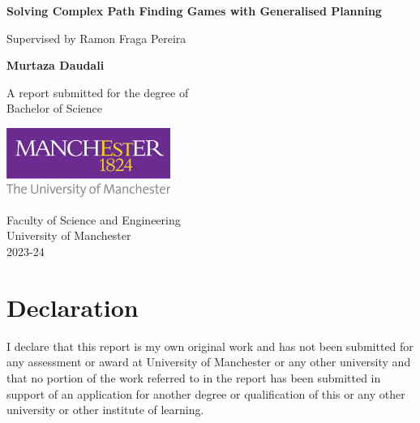 \documentclass[12pt,a4paper]{report}
\begin{document}
\begin{titlepage}
    \begin{center}
        \vspace*{1cm}

        \Huge
        \textbf{Solving Complex Path Finding Games with Generalised Planning}
            
        \vspace{0.5cm}
        \LARGE
        Supervised by Ramon Fraga Pereira
            
        \vspace{1.5cm}
            
        \textbf{Murtaza Daudali}
            
        \vfill
            
        A report submitted  for the degree of \\Bachelor of Science
            
        \vspace{0.8cm}
            
        \includegraphics[width=0.4\textwidth]{logo.jpeg}
            
        \Large
        Faculty of Science and Engineering\\
        University of Manchester\\
        2023-24
            
    \end{center}
\end{titlepage}

\setcounter{tocdepth}{1}
\tableofcontents
\listoffigures
\listoftables

\chapter*{Declaration}
I declare that this report is my own original work and has not been submitted for any assessment or award at University of Manchester or any other university and that no portion of the work referred to in the report has been submitted in support of an application for another degree or qualification of this or any other university or other institute of learning.
\end{document}
